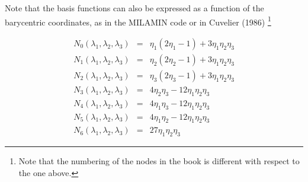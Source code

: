 Note that the basis functions can also be expressed as a function of the barycentric coordinates, 
as in the MILAMIN code \cite{daks08} or in Cuvelier \etal (1986) \cite{cuss86}\footnote{Note
that the numbering of the nodes in the book is different with respect to the one above. }

\begin{eqnarray}
N_0(\lambda_1,\lambda_2,\lambda_3) &=& \eta_1(2\eta_1-1)+ 3\eta_1\eta_2\eta_3\\
N_1(\lambda_1,\lambda_2,\lambda_3) &=& \eta_2(2\eta_2-1)+ 3\eta_1\eta_2\eta_3\\
N_2(\lambda_1,\lambda_2,\lambda_3) &=& \eta_3(2\eta_3-1)+ 3\eta_1\eta_2\eta_3\\
N_3(\lambda_1,\lambda_2,\lambda_3) &=& 4\eta_2\eta_3 - 12\eta_1\eta_2\eta_3\\
N_4(\lambda_1,\lambda_2,\lambda_3) &=& 4\eta_1\eta_3 - 12\eta_1\eta_2\eta_3\\
N_5(\lambda_1,\lambda_2,\lambda_3) &=& 4\eta_1\eta_2 - 12\eta_1\eta_2\eta_3\\
N_6(\lambda_1,\lambda_2,\lambda_3) &=& 27\eta_1\eta_2\eta_3 
\end{eqnarray}






